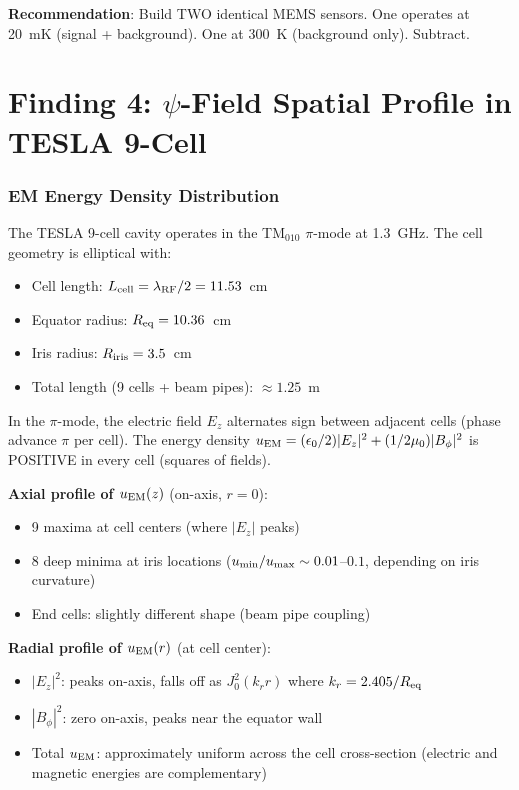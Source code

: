 \documentclass[11pt]{article}
\theoremstyle{definition}
\theoremstyle{remark}
\begin{document}
\textbf{Recommendation}: Build TWO identical MEMS sensors. One
operates at 20~mK (signal + background). One at 300~K (background
only). Subtract.


\part{Finding 4: $\psi$-Field Spatial Profile in TESLA 9-Cell}
\label{part:profile}


\section{EM Energy Density Distribution}

The TESLA 9-cell cavity operates in the TM$_{010}$ $\pi$-mode
at 1.3~GHz. The cell geometry is elliptical with:
\begin{itemize}[nosep]
\item Cell length: $L_{\rm cell} = \lambda_{\rm RF}/2 = 11.53$~cm
\item Equator radius: $R_{\rm eq} = 10.36$~cm
\item Iris radius: $R_{\rm iris} = 3.5$~cm
\item Total length (9 cells + beam pipes): $\approx 1.25$~m
\end{itemize}

In the $\pi$-mode, the electric field $E_z$ alternates sign
between adjacent cells (phase advance $\pi$ per cell). The
energy density $u_{\rm EM} = (\epsilon_0/2)|E_z|^2 + (1/2\mu_0)|B_\phi|^2$
is POSITIVE in every cell (squares of fields).

\textbf{Axial profile of $u_{\rm EM}(z)$} (on-axis, $r = 0$):
\begin{itemize}[nosep]
\item 9 maxima at cell centers (where $|E_z|$ peaks)
\item 8 deep minima at iris locations ($u_{\rm min}/u_{\rm max}
  \sim 0.01$--$0.1$, depending on iris curvature)
\item End cells: slightly different shape (beam pipe coupling)
\end{itemize}

\textbf{Radial profile of $u_{\rm EM}(r)$} (at cell center):
\begin{itemize}[nosep]
\item $|E_z|^2$: peaks on-axis, falls off as $J_0^2(k_r r)$
  where $k_r = 2.405/R_{\rm eq}$
\item $|B_\phi|^2$: zero on-axis, peaks near the equator wall
\item Total $u_{\rm EM}$: approximately uniform across the cell
  cross-section (electric and magnetic energies are complementary)
\end{itemize}
\end{document}
